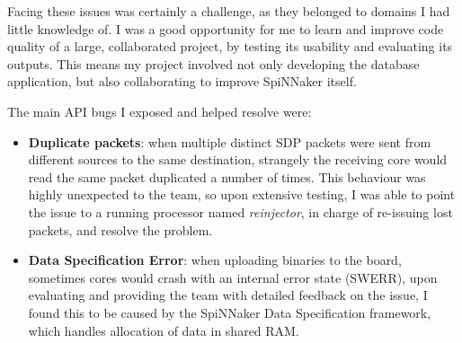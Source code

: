 Facing these issues was certainly a challenge, as they belonged to domains I had little knowledge of. I was a good opportunity for me to learn and improve code quality of a large, collaborated project, by testing its usability and evaluating its outputs. This means my project involved not only developing the database application, but also collaborating to improve SpiNNaker itself.

The main API bugs I exposed and helped resolve were:

\begin{itemize}
\item \textbf{Duplicate packets}: when multiple distinct SDP packets were sent from different sources to the same destination, strangely the receiving core would read the same packet duplicated a number of times. This behaviour was highly unexpected to the team, so upon extensive testing, I was able to point the issue to a running processor named \textit{reinjector}, in charge of re-issuing lost packets, and resolve the problem. 
\item \textbf{Data Specification Error}: when uploading binaries to the board, sometimes cores would crash with an internal error state (SWERR), upon evaluating and providing the team with detailed feedback on the issue, I found this to be caused by the SpiNNaker Data Specification framework, which handles allocation of data in shared RAM.

\end{itemize}




